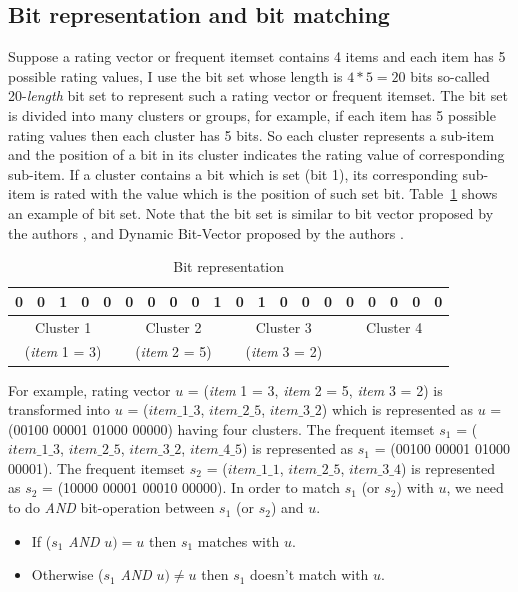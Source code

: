 \documentclass[10pt]{article}
\begin{document}
\subsection{Bit representation and bit matching}
Suppose a rating vector or frequent itemset contains 4 items and each item has 5 possible rating values, I use the bit set whose length is $4 * 5 = 20$ bits so-called 20-\textit{length} bit set to represent such a rating vector or frequent itemset. The bit set is divided into many clusters or groups, for example, if each item has 5 possible rating values then each cluster has 5 bits. So each cluster represents a sub-item and the position of a bit in its cluster indicates the rating value of corresponding sub-item. If a cluster contains a bit which is set (bit 1), its corresponding sub-item is rated with the value which is the position of such set bit. Table~\ref{table:bit.representation} shows an example of bit set. Note that the bit set is similar to bit vector proposed by the authors \cite{dong:bittablefi}, \cite{song:indexbittablefi} and Dynamic Bit-Vector proposed by the authors \cite{vo:dbv-miner}.
\begin{table}
\setlength{\tabcolsep}{3.5pt}
\centering
\caption{Bit representation}
\begin{tabular}{|c|c|c|c|c|c|c|c|c|c|c|c|c|c|c|c|c|c|c|c|} \hline
0&0&1&0&0&0&0&0&0&1&0&1&0&0&0&0&0&0&0&0\\ \hline
\multicolumn{5}{|c|}{Cluster 1}&\multicolumn{5}{|c|}{Cluster 2}&\multicolumn{5}{|c|}{Cluster 3}&\multicolumn{5}{|c|}{Cluster 4}\\
\multicolumn{5}{|c|}{(\textit{item} 1 = 3)}&\multicolumn{5}{|c|}{(\textit{item} 2 = 5)}&\multicolumn{5}{|c|}{(\textit{item} 3 = 2)}&\multicolumn{5}{|c|}{}\\ \hline
\end{tabular}
\label{table:bit.representation}
\end{table}
For example, rating vector $u$ = (\textit{item} 1 = 3, \textit{item} 2 = 5, \textit{item} 3 = 2) is transformed into $u$ = ($item\_1\_3$, $item\_2\_5$, $item\_3\_2$) which is represented as $u$ = (00100 00001 01000 00000) having four clusters. The frequent itemset $s_1$ = ($item\_1\_3$, $item\_2\_5$, $item\_3\_2$, $item\_4\_5$) is represented as $s_1$ = (00100 00001 01000 00001). The frequent itemset $s_2$ = ($item\_1\_1$, $item\_2\_5$, $item\_3\_4$) is represented as $s_2$ = (10000 00001 00010 00000). In order to match $s_1$ (or $s_2$) with $u$, we need to do \textit{AND} bit-operation between $s_1$ (or $s_2$) and $u$.
\begin{itemize}
\item If ($s_1$ \textit{AND} $u) = u$ then $s_1$ matches with $u$.
\item Otherwise ($s_1$ \textit{AND} $u) \neq u$ then $s_1$ doesn't match with $u$.
\end{itemize}
\end{document}
